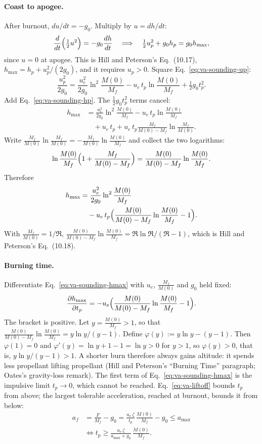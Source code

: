 \paragraph{Coast to apogee.} After burnout, $du/dt=-g_0$. Multiply by
$u=dh/dt$:
\[
 \frac{d}{dt}\Bigl(\tfrac12u^2\Bigr)=-g_0\frac{dh}{dt}
 \quad\Longrightarrow\quad
 \tfrac12u_p^2+g_0h_p=g_0h_{\max},
\]
since $u=0$ at apogee. This is Hill and Peterson's Eq.~(10.17),
$h_{\max}=h_p+u_p^2/(2g_0)$, and it requires $u_p>0$. Square
Eq.~\ref{eq:va-sounding-up}:
\[
 \frac{u_p^2}{2g_0}
 =\frac{u_e^2}{2g_0}\ln^2\frac{M(0)}{M_f}
  -u_e\,t_p\ln\frac{M(0)}{M_f}+\tfrac12g_0t_p^2 .
\]
Add Eq.~\ref{eq:va-sounding-hp}. The $\tfrac12g_0t_p^2$ terms cancel:
\[
\begin{aligned}
 h_{\max}&=\frac{u_e^2}{2g_0}\ln^2\frac{M(0)}{M_f}
  -u_e\,t_p\ln\frac{M(0)}{M_f}\\
 &\quad+u_e\,t_p
  +u_e\,t_p\frac{M_f}{M(0)-M_f}\ln\frac{M_f}{M(0)} .
\end{aligned}
\]
Write $\frac{M_f}{M(0)}\ln \frac{M_f}{M(0)}=-\frac{M_f}{M(0)}\ln\frac{M(0)}{M_f}$ and collect
the two logarithms:
\[
 \ln\frac{M(0)}{M_f}\Bigl(1+\frac{M_f}{M(0)-M_f}\Bigr)
 =\frac{M(0)}{M(0)-M_f}\ln\frac{M(0)}{M_f} .
\]
Therefore
\begin{equation}\label{eq:va-sounding-hmax}
\begin{aligned}
 h_{\max}&=\frac{u_e^2}{2g_0}\ln^2\frac{M(0)}{M_f}\\
 &\quad-u_e\,t_p\Bigl(\frac{M(0)}{M(0)-M_f}\ln\frac{M(0)}{M_f}-1\Bigr).
\end{aligned}
\end{equation}
With $\frac{M_f}{M(0)}=1/\mathfrak R$,
$\frac{M(0)}{M(0)-M_f}\ln\frac{M(0)}{M_f}=\mathfrak R\ln\mathfrak R/(\mathfrak R-1)$,
which is Hill and Peterson's Eq.~(10.18).

\paragraph{Burning time.} Differentiate
Eq.~\ref{eq:va-sounding-hmax} with $u_e$, $\frac{M_f}{M(0)}$ and $g_0$ held fixed:
\[
 \frac{\partial h_{\max}}{\partial t_p}
 =-u_e\Bigl(\frac{M(0)}{M(0)-M_f}\ln\frac{M(0)}{M_f}-1\Bigr).
\]
The bracket is positive. Let $y=\frac{M(0)}{M_f}>1$, so that
$\frac{M(0)}{M(0)-M_f}\ln\frac{M(0)}{M_f}=y\ln y/(y-1)$. Define
$\varphi(y):=y\ln y-(y-1)$. Then $\varphi(1)=0$ and
$\varphi'(y)=\ln y+1-1=\ln y>0$ for $y>1$, so $\varphi(y)>0$, that is,
$y\ln y/(y-1)>1$. A shorter burn therefore always gains altitude: it spends
less propellant lifting propellant (Hill and Peterson's ``Burning Time''
paragraph; Oates's gravity-loss remark). The first term of
Eq.~\ref{eq:va-sounding-hmax} is the impulsive limit $t_p\to0$, which cannot
be reached. Eq.~\ref{eq:va-liftoff} bounds $t_p$ from above; the largest
tolerable acceleration, reached at burnout, bounds it from below:
\[
\begin{aligned}
 a_f&=\frac{F}{M_f}-g_0
 =\frac{u_e\,\zeta}{t_p}\,\frac{M(0)}{M_f}-g_0\le a_{\max}\\
 &\iff t_p\ge\frac{u_e\,\zeta}{a_{\max}+g_0}\,\frac{M(0)}{M_f}.
\end{aligned}
\]

